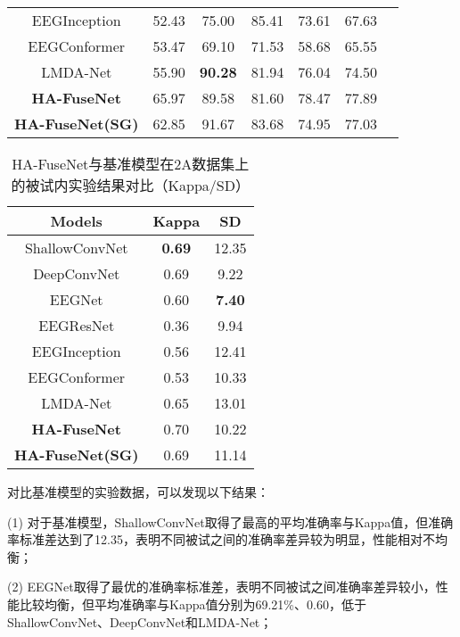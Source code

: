 \begin{table}[ht]
\begin{subtable}[ht]{\textwidth}
\begin{tabularx}{\textwidth}{cCCCCCC}
        EEGInception\cite{zhang2021eeg} & 52.43 & 75.00 & 85.41 & 73.61 & 67.63 \\
        EEGConformer\cite{song2022eeg} & 53.47 & 69.10 & 71.53 & 58.68 & 65.55 \\
        LMDA-Net\cite{miao2023lmda} & 55.90 & \textbf{90.28} & 81.94 & 76.04 & 74.50 \\
        \midrule 
        \textbf{HA-FuseNet}  & 65.97 & 89.58 & 81.60 & 78.47 & 77.89 \\
        \textbf{HA-FuseNet(SG)}  & 62.85 & 91.67 & 83.68 & 74.95 & 77.03 \\
        \bottomrule
      \end{tabularx}
    \end{subtable}
\end{table}
\begin{table}[H]
    \centering
    \caption{HA-FuseNet与基准模型在2A数据集上的被试内实验结果对比（Kappa/SD）}
    \label{tab:2acompareinsd}
    \begin{tabularx}{\textwidth}{CCC}
      \toprule
      Models & Kappa & SD \\
      \midrule
      ShallowConvNet\cite{schirrmeister2017deep} & \textbf{0.69} & 12.35\\
      DeepConvNet\cite{schirrmeister2017deep} & 0.69 & 9.22 \\
      EEGNet\cite{lawhern2018eegnet} & 0.60 & \textbf{7.40} \\
      EEGResNet\cite{HBM:HBM23730} & 0.36 & 9.94 \\
      EEGInception\cite{zhang2021eeg} & 0.56 & 12.41 \\
      EEGConformer\cite{song2022eeg} & 0.53 & 10.33 \\
      LMDA-Net\cite{miao2023lmda} & 0.65 & 13.01 \\
      \midrule 
      \textbf{HA-FuseNet} &0.70&10.22\\
      \textbf{HA-FuseNet(SG)} &0.69&11.14\\
      \bottomrule
    \end{tabularx}
\end{table}

对比基准模型的实验数据，可以发现以下结果：

(1) 对于基准模型，ShallowConvNet取得了最高的平均准确率与Kappa值，但准确率标准差达到了12.35，表明不同被试之间的准确率差异较为明显，性能相对不均衡；

(2) EEGNet取得了最优的准确率标准差，表明不同被试之间准确率差异较小，性能比较均衡，但平均准确率与Kappa值分别为69.21\%、0.60，低于ShallowConvNet、DeepConvNet和LMDA-Net；

